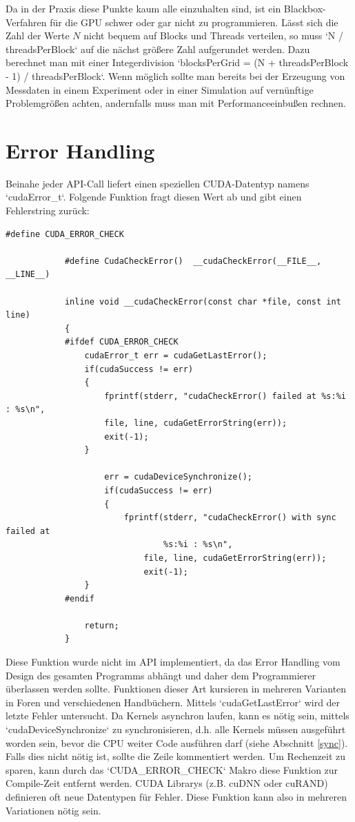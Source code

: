         Da in der Praxis diese Punkte kaum alle einzuhalten sind, ist ein Blackbox-Verfahren für die GPU schwer oder gar nicht zu programmieren. Lässt sich die Zahl der Werte $N$ nicht bequem auf \Glspl{Block} und \Glspl{Thread} verteilen, so muss \li`N / threadsPerBlock` auf die nächst größere Zahl aufgerundet werden. Dazu berechnet man mit einer Integerdivision \li`blocksPerGrid = (N + threadsPerBlock - 1) / threadsPerBlock`. Wenn möglich sollte man bereits bei der Erzeugung von Messdaten in einem Experiment oder in einer Simulation auf vernünftige Problemgrößen achten, andernfalls muss man mit \Gls{Performance}einbußen rechnen.
        				
        \newpage				
		\section{Error Handling}
		Beinahe jeder \Gls{API}-Call liefert einen speziellen CUDA-Datentyp namens \li`cudaError_t`. Folgende Funktion fragt diesen Wert ab und gibt einen Fehlerstring zurück:		
		\begin{lstlisting}[caption=Error Handling]
			#define CUDA_ERROR_CHECK

			#define CudaCheckError()  __cudaCheckError(__FILE__, __LINE__)

			inline void __cudaCheckError(const char *file, const int line)
			{
			#ifdef CUDA_ERROR_CHECK
				cudaError_t err = cudaGetLastError();
				if(cudaSuccess != err)
				{
					fprintf(stderr, "cudaCheckError() failed at %s:%i : %s\n",
					file, line, cudaGetErrorString(err));
					exit(-1);
				}

    			    err = cudaDeviceSynchronize();
    			    if(cudaSuccess != err)
    			    {
        			    fprintf(stderr, "cudaCheckError() with sync failed at 
        			        	%s:%i : %s\n",
				        	file, line, cudaGetErrorString(err));
				        	exit(-1);
				}
			#endif

				return;
			}
		\end{lstlisting}
		
		Diese Funktion wurde nicht im \Gls{API} implementiert, da das Error Handling vom Design des gesamten Programms abhängt und daher dem Programmierer überlassen werden sollte. Funktionen dieser Art kursieren in mehreren Varianten in Foren und verschiedenen Handbüchern. Mittels \li`cudaGetLastError` wird der letzte Fehler untersucht. Da \Glspl{Kernel} asynchron laufen, kann es nötig sein, mittels \li`cudaDeviceSynchronize` zu synchronisieren, d.h. alle \Glspl{Kernel} müssen ausgeführt worden sein, bevor die CPU weiter Code ausführen darf (siehe Abschnitt \ref{sync}). Falls dies nicht nötig ist, sollte die Zeile kommentiert werden. Um Rechenzeit zu sparen, kann durch das \li`CUDA_ERROR_CHECK` Makro diese Funktion zur Compile-Zeit entfernt werden. CUDA Librarys (z.B. cuDNN oder cuRAND) definieren oft neue Datentypen für Fehler. Diese Funktion kann also in mehreren Variationen nötig sein.


